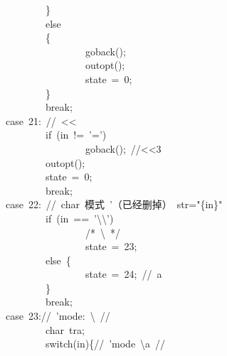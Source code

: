 \documentclass{article}
\begin{document}
\begin{mdpre}
~~~~~~~~~~~~~~~~~~~~~~~~\}\\
~~~~~~~~~~~~~~~~~~~~~~~~{else}\\
~~~~~~~~~~~~~~~~~~~~~~~~\{\\
~~~~~~~~~~~~~~~~~~~~~~~~~~~~~~~~goback();\\
~~~~~~~~~~~~~~~~~~~~~~~~~~~~~~~~outopt();\\
~~~~~~~~~~~~~~~~~~~~~~~~~~~~~~~~state~=~{0};\\
~~~~~~~~~~~~~~~~~~~~~~~~\}\\
~~~~~~~~~~~~~~~~~~~~~~~~{break};\\
~~~~~~~~~~~~~~~~{case}~{21}:~{//~\textless{}\textless{}}\\
~~~~~~~~~~~~~~~~~~~~~~~~{if}~(in~!=~{'='})\\
~~~~~~~~~~~~~~~~~~~~~~~~~~~~~~~~goback();~{//\textless{}\textless{}3}\\
~~~~~~~~~~~~~~~~~~~~~~~~outopt();\\
~~~~~~~~~~~~~~~~~~~~~~~~state~=~{0};\\
~~~~~~~~~~~~~~~~~~~~~~~~{break};\\
~~~~~~~~~~~~~~~~{case}~{22}:~{//~char~模式~'（已经删掉）~str="\{in\}"}\\
~~~~~~~~~~~~~~~~~~~~~~~~{if}~(in~==~{'}{\textbackslash{}\textbackslash{}}{'})\\
~~~~~~~~~~~~~~~~~~~~~~~~~~~~~~~~{/*}{~\textbackslash{}~}{*/}\\
~~~~~~~~~~~~~~~~~~~~~~~~~~~~~~~~state~=~{23};\\
~~~~~~~~~~~~~~~~~~~~~~~~{else}~\{\\
~~~~~~~~~~~~~~~~~~~~~~~~~~~~~~~~state~=~{24};~{//~a}\\
~~~~~~~~~~~~~~~~~~~~~~~~\}~\\
~~~~~~~~~~~~~~~~~~~~~~~~{break};\\
~~~~~~~~~~~~~~~~{case}~{23}://~{'}mode:~\textbackslash{}~{//}\\
~~~~~~~~~~~~~~~~~~~~~~~~{char}~tra;\\
~~~~~~~~~~~~~~~~~~~~~~~~{switch}(in)\{{//~'mode~\textbackslash{}a~//}\\

\end{mdpre}
\end{document}
